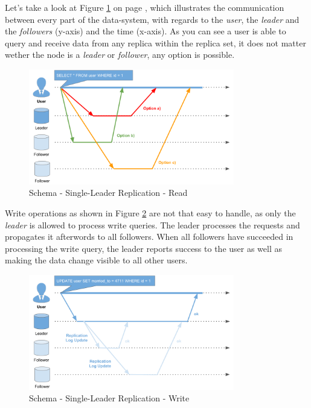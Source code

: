 {Let's take a look at Figure \ref{schema_replication_sl_read} on page \pageref{schema_replication_sl_read}, which illustrates the communication between every part of the data-system, with regards to the \textit{user}, the \textit{leader} and the \textit{followers} (y-axis) and the time (x-axis). As you can see a user is able to query and receive data from any replica within the replica set, it does not matter wether the node is a \textit{leader} or \textit{follower}, any option is possible.

\begin{figure}[H]
	\centering
  \includegraphics[width=0.8\textwidth]{replication_schema_sl_read.png}
	\caption{Schema - Single-Leader Replication - Read}
	\label{schema_replication_sl_read}
\end{figure}

Write operations as shown in Figure \ref{schema_replication_sl_write} are not that easy to handle, as only the \textit{leader} is allowed to process write queries. The leader processes the requests and propagates it afterwords to all followers. When all followers have succeeded in processing the write query, the leader reports success to the user as well as making the data change visible to all other users.

\begin{figure}[H]
	\centering
  \includegraphics[width=0.8\textwidth]{replication_schema_sl_write.png}
	\caption{Schema - Single-Leader Replication - Write}
	\label{schema_replication_sl_write}
\end{figure}
\newpage

}
